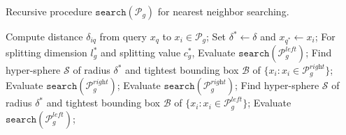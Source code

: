 \documentclass[11pt,a4paper,]{article}
\begin{document}
\begin{algorithm}[!htb]
  \caption{Recursive procedure $\mathtt{search}(\mathcal{P}_g)$ for nearest neighbor searching.}
  \label{alg:searchkdtree}
  \begin{algorithmic}[1]
  \STATE Compute distance $\delta_{iq}$ from query $x_q$ to $x_i\in\mathcal{P}_g$;
  \STATE Set $\delta^*\leftarrow\delta$ and $x_{q^*}\leftarrow x_{i}$;
  \ENDIF
  \RETURN
  \ELSE
  \STATE For splitting dimension $l_g^*$ and splitting value $c_g^*$,
  \STATE Evaluate $\mathtt{search}(\mathcal{P}^{\textit{left}}_g)$;
  \STATE Find hyper-sphere $\mathcal{S}$ of radius $\delta^*$ and tightest bounding box $\mathcal{B}$ of $\{x_i:x_i\in\mathcal{P}^{\textit{right}}_g\}$;
  \STATE Evaluate $\mathtt{search}(\mathcal{P}^{\textit{right}}_g)$;
  \ENDIF
  \RETURN
  \ELSE
  \STATE Evaluate $\mathtt{search}(\mathcal{P}^{\textit{right}}_g)$;
  \STATE Find hyper-sphere $\mathcal{S}$ of radius $\delta^*$ and tightest bounding box $\mathcal{B}$ of $\{x_i:x_i\in\mathcal{P}^{\textit{left}}_g\}$;
  \STATE Evaluate $\mathtt{search}(\mathcal{P}^{\textit{left}}_g)$;
  \ENDIF
  \RETURN
  \ENDIF
  \ENDIF
  \end{algorithmic}
\end{algorithm}
\end{document}
